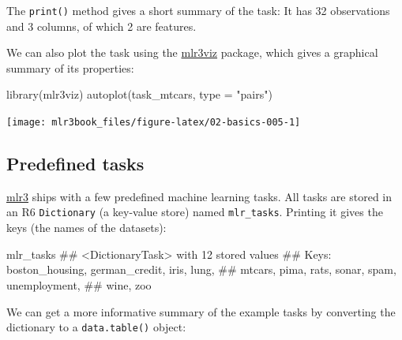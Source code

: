 \documentclass[
  11pt,
  parskip=half,
  DIV=calc,
  BCOR=10mm,
  x11names]{scrbook}
\newenvironment{Shaded}{}{}
\newcommand{\DataTypeTok}[1]{#1}
\newcommand{\KeywordTok}[1]{\textcolor[rgb]{0.00,0.00,1.00}{#1}}
\newcommand{\NormalTok}[1]{#1}
\newcommand{\StringTok}[1]{\textcolor[rgb]{0.00,0.50,0.50}{#1}}
\begin{document}
The \texttt{print()} method gives a short summary of the task:
It has 32 observations and 3 columns, of which 2 are features.

We can also plot the task using the \href{https://mlr3viz.mlr-org.com}{mlr3viz} package, which gives a graphical summary of its properties:

\begin{Shaded}
\begin{Highlighting}[]
\KeywordTok{library}\NormalTok{(mlr3viz)}
\KeywordTok{autoplot}\NormalTok{(task_mtcars, }\DataTypeTok{type =} \StringTok{"pairs"}\NormalTok{)}
\end{Highlighting}
\end{Shaded}

\begin{center}\texttt{[image: mlr3book\_files/figure-latex/02-basics-005-1]} \end{center}

\hypertarget{tasks-predefined}{%
\subsection{Predefined tasks}\label{tasks-predefined}}

\href{https://mlr3.mlr-org.com}{mlr3} ships with a few predefined machine learning tasks.
All tasks are stored in an R6 \texttt{Dictionary} (a key-value store) named \texttt{mlr\_tasks}.
Printing it gives the keys (the names of the datasets):

\begin{Shaded}
\begin{Highlighting}[]
\NormalTok{mlr_tasks}
\NormalTok{## <DictionaryTask> with 12 stored values}
\NormalTok{## Keys: boston_housing, german_credit, iris, lung,}
\NormalTok{##   mtcars, pima, rats, sonar, spam, unemployment,}
\NormalTok{##   wine, zoo}
\end{Highlighting}
\end{Shaded}

We can get a more informative summary of the example tasks by converting the dictionary to a \texttt{data.table()} object:
\end{document}
